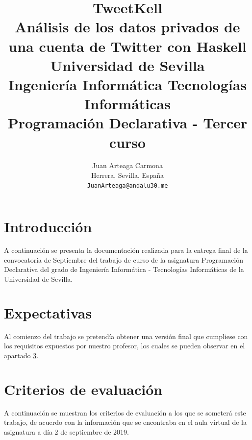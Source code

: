 \documentclass[11pt]{article}
\title{
        \textbf{TweetKell}\\
        \medskip
        \large{Análisis de los datos privados de una cuenta de Twitter con Haskell}\\
        \bigskip
        Universidad de Sevilla\\ Ingeniería Informática Tecnologías Informáticas\\
        Programación Declarativa - Tercer curso}
\author{
Juan Arteaga Carmona\\
Herrera, Sevilla, España \\
\texttt{JuanArteaga@andalu30.me}\\
}
\begin{document}
\maketitle
\newpage

\tableofcontents
\listoffigures
\newpage

\section{Introducción}
A continuación se presenta la documentación realizada para la entrega final de la convocatoria de Septiembre del trabajo de curso de la asignatura Programación Declarativa del grado de Ingeniería Informática - Tecnologías Informáticas de la Universidad de Sevilla.

\section{Expectativas}
Al comienzo del trabajo se pretendía obtener una versión final que cumpliese con los requisitos expuestos por nuestro profesor, los cuales se pueden observar en el apartado \ref{apt:criterios}.

\section{Criterios de evaluación}\label{apt:criterios}
A continuación se muestran los criterios de evaluación a los que se someterá este trabajo, de acuerdo con la información que se encontraba en el aula virtual de la asignatura a día 2 de septiembre de 2019.
\end{document}
